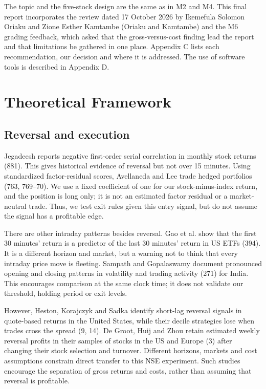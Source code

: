 \documentclass[11pt,a4paper]{article}
\begin{document}
The topic and the five-stock design are the same as in M2 and M4. This final report incorporates the review dated 17 October 2026 by Ikemefula Solomon Oriaku and Zione Esther Kamtambe (Oriaku and Kamtambe) and the M6 grading feedback, which asked that the gross-versus-cost finding lead the report and that limitations be gathered in one place. Appendix C lists each recommendation, our decision and where it is addressed. The use of software tools is described in Appendix D.

\section*{Theoretical Framework}

\subsection*{Reversal and execution}

Jegadeesh reports negative first-order serial correlation in monthly stock returns (881). This gives historical evidence of reversal but not over 15 minutes. Using standardized factor-residual scores, Avellaneda and Lee trade hedged portfolios (763, 769--70). We use a fixed coefficient of one for our stock-minus-index return, and the position is long only; it is not an estimated factor residual or a market-neutral trade. Thus, we test exit rules given this entry signal, but do not assume the signal has a profitable edge.

There are other intraday patterns besides reversal. Gao et al. show that the first 30 minutes' return is a predictor of the last 30 minutes' return in US ETFs (394). It is a different horizon and market, but a warning not to think that every intraday price move is fleeting. Sampath and Gopalaswamy document pronounced opening and closing patterns in volatility and trading activity (271) for India. This encourages comparison at the same clock time; it does not validate our threshold, holding period or exit levels.

However, Heston, Korajczyk and Sadka identify short-lag reversal signals in quote-based returns in the United States, while their decile strategies lose when trades cross the spread (9, 14). De Groot, Huij and Zhou retain estimated weekly reversal profits in their samples of stocks in the US and Europe (3) after changing their stock selection and turnover. Different horizons, markets and cost assumptions constrain direct transfer to this NSE experiment. Such studies encourage the separation of gross returns and costs, rather than assuming that reversal is profitable.
\end{document}
